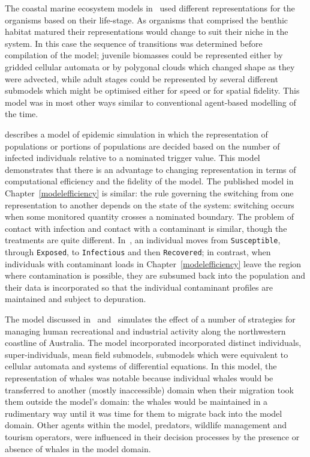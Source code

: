 The coastal marine ecosystem models in~\cite{Gray06:1} used different
representations for the organisms based on their life-stage. As
organisms that comprised the benthic habitat matured their
representations would change to suit their niche in the system.  In
this case the sequence of transitions was determined before
compilation of the model; juvenile biomasses could be represented
either by gridded cellular automata or by polygonal clouds which
changed shape as they were advected, while adult stages could be
represented by several different submodels which might be optimised
either for speed or for spatial fidelity.  This model was in most
other ways similar to conventional agent-based modelling of the time.


\Cite{bobashev2007hybrid} describes a model of epidemic simulation in
which the representation of populations or portions of populations are
decided based on the number of infected individuals relative to a
nominated trigger value. This model demonstrates that there is an
advantage to changing representation in terms of computational
efficiency and the fidelity of the model. The published model in
Chapter~\ref{modelefficiency} is similar: the rule governing the
switching from one representation to another depends on the state of
the system: switching occurs when some monitored quantity crosses a
nominated boundary. The problem of contact with infection and contact
with a contaminant is similar, though the treatments are quite
different. In~\citet{bobashev2007hybrid}, an individual moves
from \texttt{Susceptible}, through \texttt{Exposed},
to \texttt{Infectious} and then \texttt{Recovered}; in contrast, when
individuals with contaminant loads in Chapter~\ref{modelefficiency}
leave the region where contamination is possible, they are subsumed
back into the population and their data is incorporated so that the
individual contaminant profiles are maintained and subject to
depuration.

The model discussed in~\cite{Gray2014}
and~\cite{Fulton2009crossingscales} simulates the effect of a number
of strategies for managing human recreational and industrial activity
along the northwestern coastline of Australia. The model incorporated
incorporated distinct individuals, super-individuals, mean field
submodels, submodels which were equivalent to cellular automata and
systems of differential equations. In this model, the representation
of whales was notable because individual whales would be transferred
to another (mostly inaccessible) domain when their migration took them
outside the model's domain: the whales would be maintained in a
rudimentary way until it was time for them to migrate back into the
model domain. Other agents within the model, predators, wildlife
management and tourism operators, were influenced in their decision
processes by the presence or absence of whales in the model domain.

